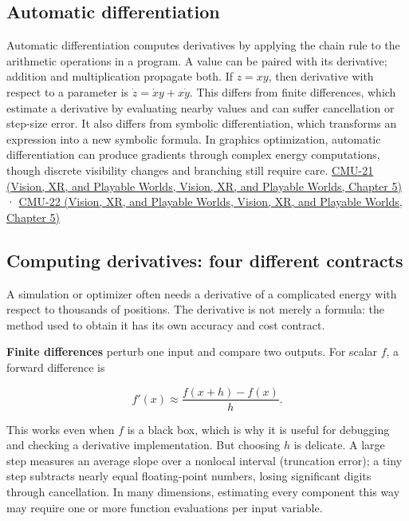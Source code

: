 \subsection{Automatic differentiation}\label{04-visual-computing-ii-ch029-automatic-differentiation}

Automatic differentiation computes derivatives by applying the chain rule to the arithmetic operations in a program. A value can be paired with its derivative; addition and multiplication propagate both. If \(z=xy\), then derivative with respect to a parameter is \(\dot z=\dot x y+x\dot y\). This differs from finite differences, which estimate a derivative by evaluating nearby values and can suffer cancellation or step-size error. It also differs from symbolic differentiation, which transforms an expression into a new symbolic formula. In graphics optimization, automatic differentiation can produce gradients through complex energy computations, though discrete visibility changes and branching still require care. \href{../07-Vision-XR-and-Playable-Worlds/main.pdf\#nameddest=04-visual-computing-ii-ch036-cmu-21---dynamics-and-time-integration}{CMU-21 (Vision, XR, and Playable Worlds, Vision, XR, and Playable Worlds, Chapter 5)} · \href{../07-Vision-XR-and-Playable-Worlds/main.pdf\#nameddest=04-visual-computing-ii-ch036-cmu-22---optimization}{CMU-22 (Vision, XR, and Playable Worlds, Vision, XR, and Playable Worlds, Chapter 5)}

\subsection{Computing derivatives: four different contracts}\label{04-visual-computing-ii-ch029-computing-derivatives-four-different-contracts}

A simulation or optimizer often needs a derivative of a complicated energy with respect to thousands of positions. The derivative is not merely a formula: the method used to obtain it has its own accuracy and cost contract.

\textbf{Finite differences} perturb one input and compare two outputs. For scalar \(f\), a forward difference is

\[
f'(x)\approx\frac{f(x+h)-f(x)}{h}.
\]

This works even when \(f\) is a black box, which is why it is useful for debugging and checking a derivative implementation. But choosing \(h\) is delicate. A large step measures an average slope over a nonlocal interval (truncation error); a tiny step subtracts nearly equal floating-point numbers, losing significant digits through cancellation. In many dimensions, estimating every component this way may require one or more function evaluations per input variable.

